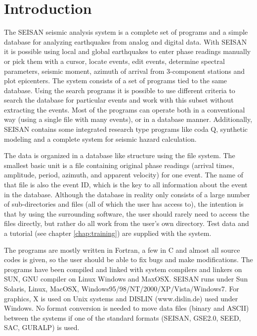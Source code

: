 
\chapter{Introduction}
\label{chp:intro}

The SEISAN seismic analysis system is a complete set of programs and a simple database for analyzing earthquakes from analog and digital data. With SEISAN it is possible using local and global earthquakes to enter phase readings manually or pick them with a cursor, locate events, edit events, determine spectral parameters, seismic moment, azimuth of arrival from 3-component stations and plot epicenters. The system consists of a set of programs tied to the same database. Using the search programs it is possible to use different criteria to search the database for particular events and work with this subset without extracting the events. Most of the programs can operate both in a conventional way (using a single file with many events), or in a database manner. Additionally, SEISAN contains some integrated research type programs like coda Q, synthetic modeling and a complete system for seismic hazard calculation. 

The data is organized in a database like structure using the file system. The smallest basic unit is a file containing original phase readings (arrival times, amplitude, period, azimuth, and apparent velocity) for one event. The name of that file is also the event ID, which is the key to all information about the event in the database. Although the database in reality only consists of a large number of sub-directories and files (all of which the user has access to), the intention is that by using the surrounding software, the user should rarely need to access the files directly, but rather do all work from the user's own directory. Test data and a tutorial (see %
chapter \ref{chap:training}) are supplied with the system. 

The programs are mostly written in Fortran, a few in C and almost all source codes is given, so the user should be able to fix bugs and make modifications. The programs have been compiled and linked with system compilers and linkers on SUN, GNU compiler on Linux 
Windows
and MaxOSX. 
 SEISAN runs under Sun Solaris, Linux, MacOSX, Windows95/98/NT/2000/XP/Vista/Windows7. 
For graphics, X is used on Unix systems and DISLIN 
(www.dislin.de) used under Windows. 
No format conversion is needed to move data files (binary and ASCII) between the systems if one of the standard formats (SEISAN, GSE2.0, SEED, SAC, GURALP) is used.  

